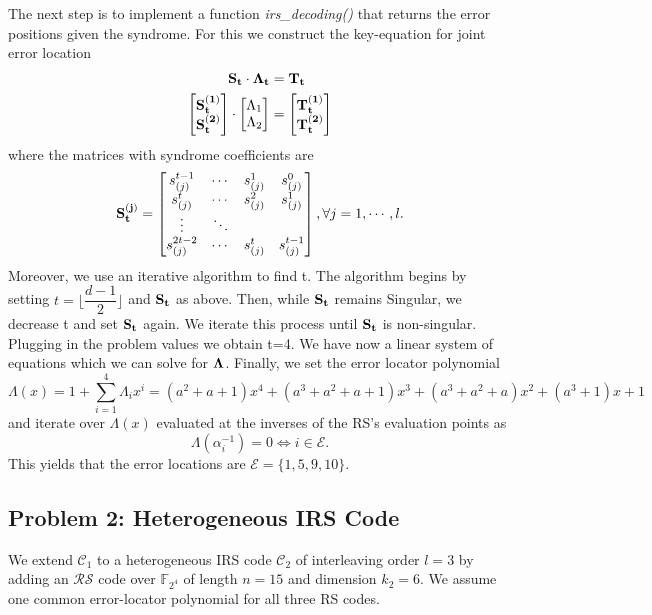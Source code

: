 \documentclass{article}
\begin{document}
The next step is to implement a function \textit{irs\_decoding()} that returns the error positions given the syndrome. For this we construct the key-equation for joint error location
\begin{align*}
\vb{S_t}\cdot\vb{\Lambda_t} &= \vb{T_t}\\
\begin{bmatrix}
\vb{S_t^{(1)}}\\
\vb{S_t^{(2)}}
\end{bmatrix}
\cdot
\begin{bmatrix}
\Lambda_1 \\
\Lambda_2 
\end{bmatrix}
&=
\begin{bmatrix}
\vb{T_t^{(1)}} \\
\vb{T_t^{(2)}}
\end{bmatrix}
\end{align*}
where the matrices with syndrome coefficients are
\begin{equation*}
\vb{S_t^{(j)}} = 
\begin{bmatrix}
s_{(j)}^{t-1} & \cdots & s_{(j)}^1 & s_{(j)}^0\\
s_{(j)}^t & \cdots & s_{(j)}^2 & s_{(j)}^1\\
\vdots & \ddots & \\
s_{(j)}^{2t-2} & \cdots & s_{(j)}^t & s_{(j)}^{t-1}
\end{bmatrix}, \forall j=1,\cdots,l.
\end{equation*}
Moreover, we use an iterative algorithm to find t. The algorithm begins by setting $t = \lfloor \dfrac{d-1}{2}\rfloor$ and $\vb{S_t}$ as above. Then, while $\vb{S_t}$ remains Singular, we decrease t and set $\vb{S_t}$ again. We iterate this process until $\vb{S_t}$ is non-singular. Plugging in the problem values we obtain t=4. We have now a linear system of equations which we can solve for $\vb{\Lambda}$. Finally, we set the error locator polynomial
\begin{equation*}
\Lambda(x) = 1 + \sum_{i=1}^4{\Lambda_i}x^i = (a^2 + a + 1)x^4 + (a^3 + a^2 + a + 1)x^3 + (a^3 + a^2 + a)x^2 + (a^3 + 1)x + 1
\end{equation*}
and iterate over $\Lambda(x)$ evaluated at the inverses of the RS's evaluation points as
\begin{equation*}
\Lambda(\alpha_i^{-1}) = 0 \Leftrightarrow i \in \mathcal{E}.
\end{equation*}
This yields that the error locations are $\mathcal{E} = \{1, 5, 9, 10\}$.

\subsection*{Problem 2: Heterogeneous IRS Code}
We extend $\mathcal{C}_1$ to a heterogeneous IRS code $\mathcal{C}_2$ of interleaving order $l = 3 $ by adding an $\mathcal{RS}$ code over $\mathbb{F}_{2^4}$ of length $n = 15$ and dimension $k_2 = 6$. We assume one common error-locator polynomial for all three RS codes.
\end{document}

